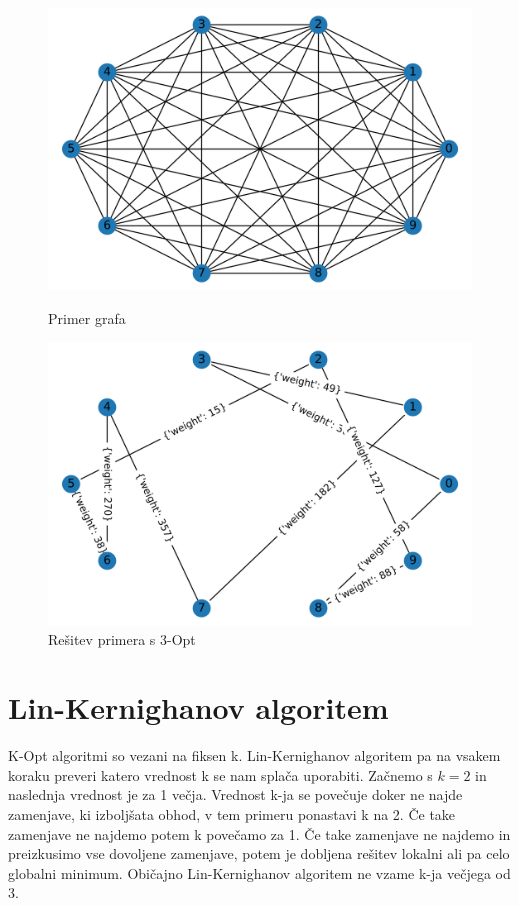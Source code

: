 \documentclass[12pt, a4paper]{article}
\begin{document}
\begin{figure}[!h]
    
    \begin{minipage}{0.5\textwidth}
    \includegraphics[width=8 cm]{primeri/primer2.png}
    \caption{Primer grafa}
    \label{primer_3_opt}
  \end{minipage}
 \hspace{1cm}
  \begin{minipage}{0.5\textwidth}
    \includegraphics[width=8 cm]{primeri/primer2_3opt.png}
    \caption{Rešitev primera s 3-Opt}
    \label{resitev_3_opt}
  \end{minipage}
    
\end{figure}




\newpage
\section[Lin-Kernighanov algoritem]{Lin-Kernighanov algoritem}
K-Opt algoritmi so vezani na fiksen k. Lin-Kernighanov algoritem pa na vsakem koraku preveri katero vrednost k se nam splača uporabiti. Začnemo s $k=2$ in naslednja vrednost je za 1 večja. Vrednost k-ja se povečuje doker ne najde zamenjave, ki izboljšata obhod, v tem primeru ponastavi  k na 2. Če take zamenjave ne najdemo potem k povečamo za 1. Če take zamenjave ne najdemo in preizkusimo vse dovoljene zamenjave, potem je dobljena rešitev lokalni ali pa celo globalni minimum.  Običajno Lin-Kernighanov algoritem ne vzame k-ja večjega od 3.\\
\end{document}
